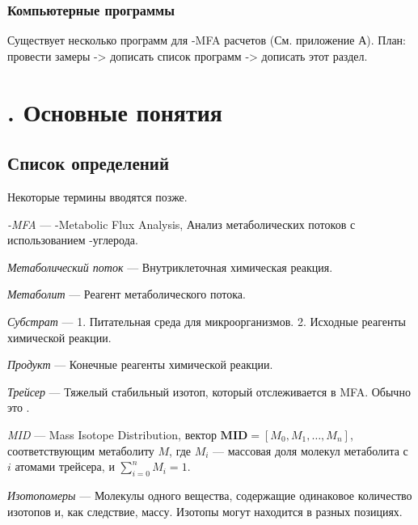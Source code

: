 \documentclass[14pt, a4paper]{extreport}
\begin{document}
	






\clearpage
\subsection{Компьютерные программы}
Существует несколько программ для -MFA расчетов (См. приложение А). 
План: провести замеры -> дописать список программ -> дописать этот раздел.

\chapter[Основные понятия]{\thechapter{}. Основные понятия}
\section{Список определений}
Некоторые термины вводятся позже.

\hangindent=1cm \noindent
\emph{-MFA} --- -Metabolic Flux Analysis, Анализ метаболических потоков с использованием -углерода.

\hangindent=1cm \noindent
\emph{Метаболический поток} --- Внутриклеточная химическая реакция.

\hangindent=1cm \noindent
\emph{Метаболит} --- Реагент метаболического потока.

\hangindent=1cm \noindent
\emph{Субстрат} --- 1. Питательная среда для микроорганизмов. 2. Исходные реагенты химической реакции.

\hangindent=1cm \noindent
\emph{Продукт} --- Конечные реагенты химической реакции.

\hangindent=1cm \noindent
\emph{Трейсер} --- Тяжелый стабильный изотоп, который отслеживается в MFA. Обычно это .

\hangindent=1cm \noindent
\emph{MID} --- Mass Isotope Distribution, вектор $\mathbf{MID} = [M_0, M_1, \ldots, M_n]$, соответствующим метаболиту $M$, где $M_i$ --- массовая доля молекул метаболита с $i$ атомами трейсера, и $\sum_{i = 0}^{n} M_i = 1$.

\hangindent=1cm \noindent
\emph{Изотопомеры} --- Молекулы одного вещества, содержащие одинаковое количество изотопов и, как следствие, массу. Изотопы могут находится в разных позициях.
\end{document}
